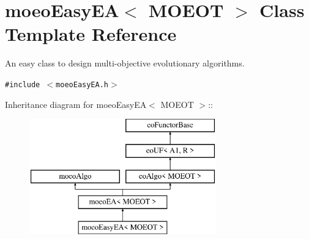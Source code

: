 \section{moeo\-Easy\-EA$<$ MOEOT $>$ Class Template Reference}
\label{classmoeoEasyEA}
An easy class to design multi-objective evolutionary algorithms.  


{\tt \#include $<$moeo\-Easy\-EA.h$>$}

Inheritance diagram for moeo\-Easy\-EA$<$ MOEOT $>$::\begin{figure}[H]
\begin{center}
\leavevmode
\includegraphics[height=5cm]{classmoeoEasyEA}
\end{center}
\end{figure}
